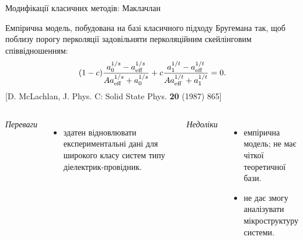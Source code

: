 \documentclass[10pt]{beamer}
\begin{document}
\begin{frame}{Модифікації класичних методів: Маклачлан}

\footnotesize
    Емпірична модель, побудована на базі класичного підходу Бругемана так, щоб поблизу порогу перколяції задовільняти перколяційним скейлінговим співвідношенням:
    \begin{equation}\label{eq:GEMA}
    (1-c) \frac{a_0^{1/s} - a_{\rm eff}^{1/s}}{Aa_{\rm
    		eff}^{1/s} + a_0^{1/s}} + c \frac{a_1^{1/t} -
    	a_{\rm eff}^{1/t}}{Aa_{\rm eff}^{1/t} + a_1^{1/t}}= 0.
    \end{equation}
    [D. McLachlan, J. Phys. C: Solid State Phys. {\bf 20} (1987) 865]
    \vspace{-5pt}
    \begin{columns}[T,onlytextwidth]
          \begin{center}
          {\it Переваги}
          \end{center}
          \vspace{-10pt}
          \begin{itemize}
              \item здатен відновлювати експериментальні дані для широкого класу систем типу діелектрик-провідник.
          \end{itemize}
    
          \begin{center}
          {\it Недоліки}
          \end{center}
          \vspace{-10pt}
          \begin{itemize}
              \item емпірична модель; не має чіткої теоретичної бази.
              \item не дає змогу аналізувати мікроструктуру системи.
          \end{itemize}
    \end{columns}

\end{frame}
\end{document}
